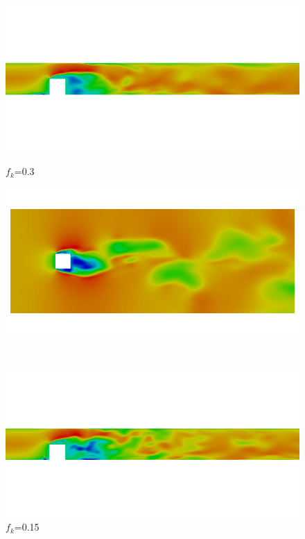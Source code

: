 \begin{figure}[H]
\ContinuedFloat
\begin{minipage}[b]{0.5\linewidth}
\includegraphics[scale=0.25]{figure/fine/three/Umag_z.png}
\caption*{$f_k$=0.3}
\end{minipage}
\begin{minipage}[b]{0.5\linewidth}
\includegraphics[scale=0.25]{figure/fine/three/Umag_y.png}
\caption*{}
\end{minipage}\\
\begin{minipage}[b]{0.5\linewidth}
\includegraphics[scale=0.25]{figure/fine/one/Umag_z.png}
\caption*{$f_k$=0.15}

\end{minipage}
\end{figure}
